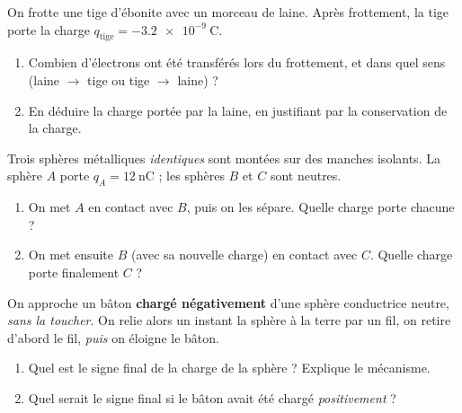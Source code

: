 \documentclass[11pt,a4paper]{article}
\begin{document}

\begin{exo}
On frotte une tige d'ébonite avec un morceau de laine. Après frottement, la tige porte la charge
$q_{\text{tige}} = \SI{-3.2e-9}{\coulomb}$.
\begin{enumerate}[label=\alph*)]
  \item Combien d'électrons ont été transférés lors du frottement, et dans quel sens (laine
        $\to$ tige ou tige $\to$ laine) ?
  \item En déduire la charge portée par la laine, en justifiant par la conservation de la charge.
\end{enumerate}
\end{exo}

\begin{exo}
Trois sphères métalliques \emph{identiques} sont montées sur des manches isolants. La sphère $A$
porte $q_A = \SI{+12}{\nano\coulomb}$ ; les sphères $B$ et $C$ sont neutres.
\begin{center}
\end{center}
\begin{enumerate}[label=\alph*)]
  \item On met $A$ en contact avec $B$, puis on les sépare. Quelle charge porte chacune ?
  \item On met ensuite $B$ (avec sa nouvelle charge) en contact avec $C$. Quelle charge porte
        finalement $C$ ?
\end{enumerate}
\end{exo}

\begin{exo}
On approche un bâton \textbf{chargé négativement} d'une sphère conductrice neutre, \emph{sans la
toucher}. On relie alors un instant la sphère à la terre par un fil, on retire d'abord le fil,
\emph{puis} on éloigne le bâton.
\begin{enumerate}[label=\alph*)]
  \item Quel est le signe final de la charge de la sphère ? Explique le mécanisme.
  \item Quel serait le signe final si le bâton avait été chargé \emph{positivement} ?
\end{enumerate}
\end{exo}
\end{document}
